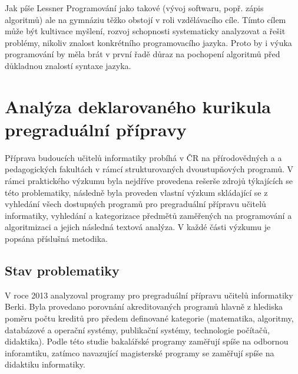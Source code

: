 \documentclass[FP,DP]{tulthesis}
\begin{document}
{{{{{{{Jak píše Lessner \citep[s. 13]{lessner2013} Programování jako takové (vývoj softwaru, popř. zápis algoritmů) ale na gymnáziu těžko obstojí v roli vzdělávacího cíle. Tímto cílem může být
kultivace myšlení, rozvoj schopnosti systematicky analyzovat a řešit problémy, nikoliv znalost konkrétního programovacího jazyka. Proto by i výuka programování by měla brát v první řadě důraz na pochopení algoritmů před důkladnou znalostí syntaxe jazyka.

\chapter{Analýza deklarovaného kurikula pregraduální přípravy}
Příprava budoucích učitelů informatiky probíhá v ČR na přírodovědných a a pedagogických fakultách v rámcí strukturovaných dvoustupňových programů. V rámci praktického výzkumu byla nejdříve provedena rešerše zdrojů týkajících se této problematiky, následně byla proveden vlastní výzkum skládající se z vyhledání všech dostupných programů pro pregraduální přípravu učitelů informatiky, vyhledání a kategorizace předmětů zaměřených na programování a algoritmizaci a jejich následná textová analýza. V každé části výzkumu je popsána příslušná metodika.

\section{Stav problematiky}
V roce 2013 analyzoval programy pro pregraduální přípravu učitelů informatiky Berki. Byla provedano porovnání akreditovaných programů  hlavně z hlediska poměru počtu kreditů pro předem definované kategorie (matematika, algoritmy, databázové a operační systémy, publikační systémy, technologie počítačů, didaktika). Podle této studie bakalářské programy zaměřují spíše na odbornou inforamtiku, zatímco navazující magisterské programy se zaměřují spíše na didaktiku informatiky. 

}}}}}}}
\end{document}
